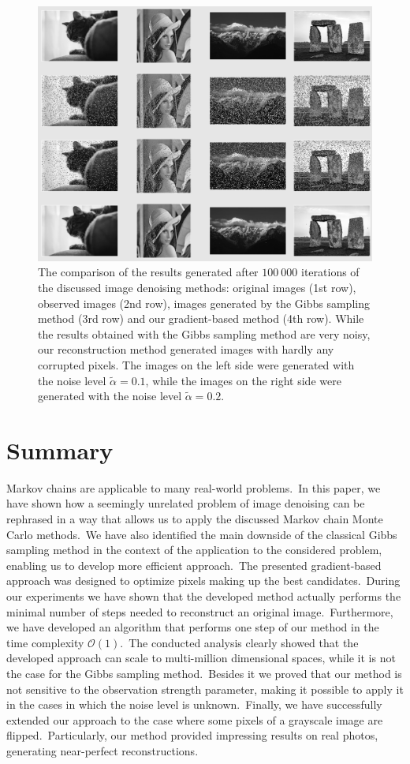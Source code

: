 \documentclass[a4paper, 11pt, onecolumn, openany, titlepage]{report}
\newcommand\numberedchapter[1]{\setlength\topskip{3cm}\chapter{#1}\setlength\topskip{0cm}}
\theoremstyle{default_theorem_style}\newtheorem{theorem}{Theorem}
\theoremstyle{default_theorem_style}\newtheorem{definition}{Definition}
\begin{document}
\begin{figure}[H]
\centering
\includegraphics[scale=0.42]{grayscale_qualitative_results}
\caption{The comparison of the results generated after $100\ 000$ iterations of the discussed image denoising
methods: original images (1st row), observed images (2nd row), images generated by the Gibbs
sampling method (3rd row) and our gradient-based method (4th row). While the results obtained with the Gibbs
sampling method are very noisy, our reconstruction method generated images with hardly any corrupted pixels. The
images on the left side were generated with the noise level $\tilde{\alpha} = 0.1$, while the images on the right
side were generated with the noise level $\tilde{\alpha} = 0.2$.}
\label{fig:grayscale_qualitative_results}
\end{figure}

\numberedchapter{Summary}

Markov chains are applicable to many real-world problems.\ In this paper, we have shown how a seemingly unrelated
problem of image denoising can be rephrased in a way that allows us to apply the discussed Markov chain Monte Carlo
methods.\ We have also identified the main downside of the classical Gibbs sampling method in the context of the
application to the considered problem, enabling us to develop more efficient approach.\ The presented
gradient-based approach was designed to optimize pixels making up the best candidates.\ During our experiments we have
shown that the developed method actually performs the minimal number of steps needed to reconstruct an original
image.\ Furthermore, we have developed an algorithm that performs one step of our method in the time complexity
$\mathcal{O}(1)$.\ The conducted analysis clearly showed that the developed approach can scale to multi-million
dimensional spaces, while it is not the case for the Gibbs sampling method.\ Besides it we proved that our method is
not sensitive to the observation strength parameter, making it possible to apply it in the cases in which the
noise level is unknown.\ Finally, we have successfully extended our approach to the case where some pixels of
a grayscale image are flipped.\ Particularly, our method provided impressing results on real photos, generating
near-perfect reconstructions.\newline
\end{document}

